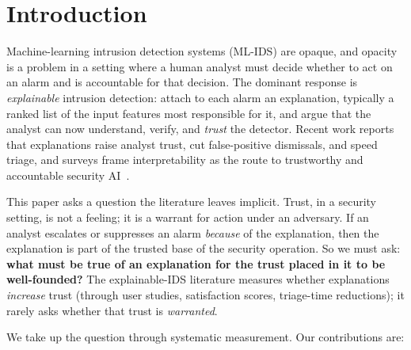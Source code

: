 \documentclass[conference]{IEEEtran}
\begin{document}
\section{Introduction}\label{sec:intro}
Machine-learning intrusion detection systems (ML-IDS) are opaque, and opacity is a problem in a
setting where a human analyst must decide whether to act on an alarm and is accountable for that
decision. The dominant response is \emph{explainable} intrusion detection: attach to each alarm
an explanation, typically a ranked list of the input features most responsible for it, and argue
that the analyst can now understand, verify, and \emph{trust} the detector. Recent work reports
that explanations raise analyst trust, cut false-positive dismissals, and speed triage, and
surveys frame interpretability as the route to trustworthy and accountable security
AI~\cite{capuano2022}.

This paper asks a question the literature leaves implicit. Trust, in a security setting, is not a
feeling; it is a warrant for action under an adversary. If an analyst escalates or suppresses an
alarm \emph{because} of the explanation, then the explanation is part of the trusted base of the
security operation. So we must ask: \textbf{what must be true of an explanation for the trust
placed in it to be well-founded?} The explainable-IDS literature measures whether explanations
\emph{increase} trust (through user studies, satisfaction scores, triage-time reductions); it
rarely asks whether that trust is \emph{warranted}.

We take up the question through systematic measurement. Our contributions are:
\end{document}
